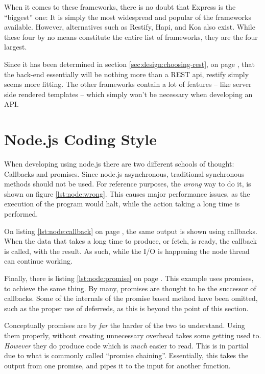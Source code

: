		When it comes to these frameworks, there is no doubt that Express is the ``biggest'' one: It is simply the most widespread and popular of the frameworks available. However, alternatives such as Restify, Hapi, and Koa also exist. While these four by no means constitute the entire list of frameworks, they are the four largest.

		Since it has been determined in section \ref{sec:design:choosing-rest}, on page \pageref{sec:design:choosing-rest}, that the back-end essentially will be nothing more than a REST api, restify simply seems more fitting. The other frameworks contain a lot of features -- like server side rendered templates -- which simply won't be necessary when developing an API. 



	\section{Node.js Coding Style}
		\label{sec:impl:node:style}
		When developing using node.js there are two different schools of thought: Callbacks and promises. Since node.js asynchronous, traditional synchronous methods should not be used. For reference purposes, the \emph{wrong} way to do it, is shown on figure \ref{lst:node:wrong}. This causes major performance issues, as the execution of the program would halt, while the action taking a long time is performed.

		On listing \ref{lst:node:callback} on page \pageref{lst:node:callback}, the same output is shown using callbacks. When the data that takes a long time to produce, or fetch, is ready, the callback is called, with the result. As such, while the I/O is happening the node thread can continue working.

		Finally, there is listing \ref{lst:node:promise} on page \pageref{lst:node:callback}. This example uses promises, to achieve the same thing. By many, promises are thought to be the successor of callbacks. Some of the internals of the promise based method have been omitted, such as the proper use of deferreds, as this is beyond the point of this section.

		Conceptually promises are by \emph{far} the harder of the two to understand. Using them properly, without creating unnecessary overhead takes some getting used to. \emph{However} they do produce code which is \emph{much} easier to read. This is in partial due to what is commonly called ``promise chaining''. Essentially, this takes the output from one promise, and pipes it to the input for another function. 

